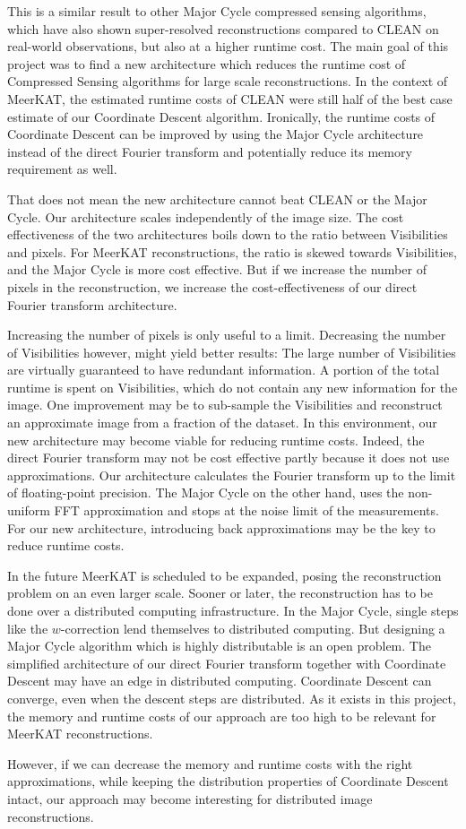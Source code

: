 This is a similar result to other Major Cycle compressed sensing algorithms, which have also shown super-resolved reconstructions compared to CLEAN on real-world observations\cite{dabbech2018cygnus}\cite{girard2015sparse}, but also at a higher runtime cost. The main goal of this project was to find a new architecture which reduces the runtime cost of Compressed Sensing algorithms for large scale reconstructions. In the context of MeerKAT, the estimated runtime costs of CLEAN were still half of the best case estimate of our Coordinate Descent algorithm. Ironically, the runtime costs of Coordinate Descent can be improved by using the Major Cycle architecture instead of the direct Fourier transform and potentially reduce its memory requirement as well.

That does not mean the new architecture cannot beat CLEAN or the Major Cycle. Our architecture scales independently of the image size. The cost effectiveness of the two architectures boils down to the ratio between Visibilities and pixels. For MeerKAT reconstructions, the ratio is skewed towards Visibilities, and the Major Cycle is more cost effective. But if we increase the number of pixels in the reconstruction, we increase the cost-effectiveness of our direct Fourier transform architecture.


Increasing the number of pixels is only useful to a limit. Decreasing the number of Visibilities however, might yield better results: The large number of Visibilities are virtually guaranteed to have redundant information. A portion of the total runtime is spent on Visibilities, which do not contain any new information for the image. One improvement may be to sub-sample the Visibilities and reconstruct an approximate image from a fraction of the dataset. In this environment, our new architecture may become viable for reducing runtime costs. Indeed, the direct Fourier transform may not be cost effective partly because it does not use approximations. Our architecture calculates the Fourier transform up to the limit of floating-point precision. The Major Cycle on the other hand, uses the non-uniform FFT approximation and stops at the noise limit of the measurements. For our new architecture, introducing back approximations may be the key to reduce runtime costs.

In the future MeerKAT is scheduled to be expanded, posing the reconstruction problem on an even larger scale. Sooner or later, the reconstruction has to be done over a distributed computing infrastructure. In the Major Cycle, single steps like the $w$-correction lend themselves to distributed computing. But designing a Major Cycle algorithm which is highly distributable is an open problem. The simplified architecture of our direct Fourier transform together with Coordinate Descent may have an edge in distributed computing. Coordinate Descent can converge, even when the descent steps are distributed. As it exists in this project, the memory and runtime costs of our approach are too high to be relevant for MeerKAT reconstructions. 

However, if we can decrease the memory and runtime costs with the right approximations, while keeping the distribution properties of Coordinate Descent intact, our approach may become interesting for distributed image reconstructions.








 